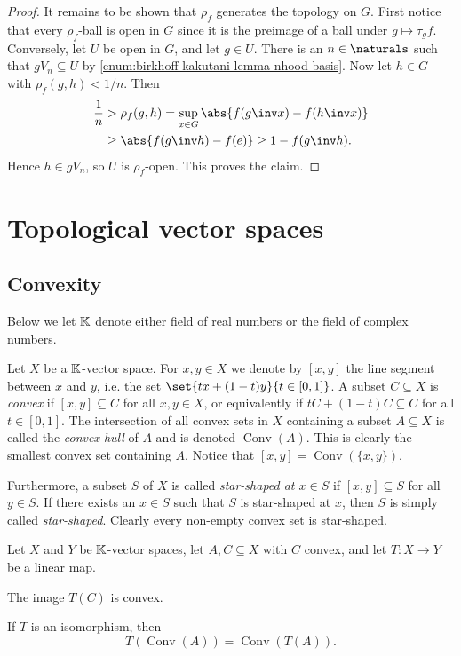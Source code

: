 \documentclass[article, a4paper, 11pt, oneside]{memoir}
\numberwithin{equation}{chapter}
\begin{document}
\begin{proof}
    It remains to be shown that $\rho_f$ generates the topology on $G$. First notice that every $\rho_f$-ball is open in $G$ since it is the preimage of a ball under $g \mapsto \tau_g f$. Conversely, let $U$ be open in $G$, and let $g \in U$. There is an $n \in \naturals$ such that $g V_n \subseteq U$ by \cref{enum:birkhoff-kakutani-lemma-nhood-basis}. Now let $h \in G$ with $\rho_f(g,h) < 1/n$. Then
    \begin{align*}
        \frac{1}{n}
            &> \rho_f(g,h)
             = \sup_{x \in G} \abs{f(g\inv x) - f(h\inv x)} \\
            &\geq \abs{f(g\inv h) - f(e)}
             \geq 1 - f(g\inv h).
    \end{align*}
    Hence $h \in gV_n$, so $U$ is $\rho_f$-open. This proves the claim.
\end{proof}


\chapter{Topological vector spaces}

\section{Convexity}

\newcommand{\conv}{\operatorname{Conv}}

Below we let $\mathbb{K}$ denote either field of real numbers or the field of complex numbers.

Let $X$ be a $\mathbb{K}$-vector space. For $x,y \in X$ we denote by $[x,y]$ the line segment between $x$ and $y$, i.e. the set $\set{tx + (1-t)y}{t \in [0,1]}$. A subset $C \subseteq X$ is \emph{convex} if $[x,y] \subseteq C$ for all $x,y \in X$, or equivalently if $tC + (1-t)C \subseteq C$ for all $t \in [0,1]$. The intersection of all convex sets in $X$ containing a subset $A \subseteq X$ is called the \emph{convex hull} of $A$ and is denoted $\conv(A)$. This is clearly the smallest convex set containing $A$. Notice that $[x,y] = \conv(\{x,y\})$.

Furthermore, a subset $S$ of $X$ is called \emph{star-shaped at $x \in S$} if $[x,y] \subseteq S$ for all $y \in S$. If there exists an $x \in S$ such that $S$ is star-shaped at $x$, then $S$ is simply called \emph{star-shaped}. Clearly every non-empty convex set is star-shaped.

\begin{lemma}
    Let $X$ and $Y$ be $\mathbb{K}$-vector spaces, let $A, C \subseteq X$ with $C$ convex, and let $T \colon X \to Y$ be a linear map.
    \begin{enumlem}
        \item \label{enum:image-of-convex-set} The image $T(C)$ is convex.
        \item \label{enum:convex-hull-isomorphism} If $T$ is an isomorphism, then
        \begin{equation*}
            T(\conv(A)) = \conv(T(A)).
        \end{equation*}
    \end{enumlem}
\end{lemma}
\end{document}

